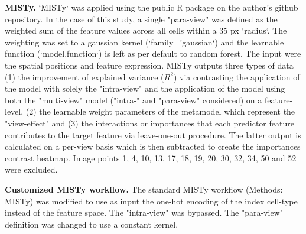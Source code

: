 \textbf{MISTy.} `MISTy` was applied using the public R package on the author's github repository. In the case of this study, a single "para-view" was defined as the weighted sum of the feature values across all cells within a 35 px `radius`. The weighting was set to a gaussian kernel (`family='gaussian`) and the learnable function (`model.function`) is left as per default to random forest. The input were the spatial positions and feature expression. MISTy outputs three types of data (1) the improvement of explained variance ($R^2$) via contrasting the application of the model with solely the "intra-view" and the application of the model using both the "multi-view" model ("intra-" and "para-view" considered) on a feature-level, (2) the learnable weight parameters of the metamodel which represent the "view-effect" and (3) the interactions or importances that each predictor feature contributes to the target feature via leave-one-out procedure. The latter output is calculated on a per-view basis which is then subtracted to create the importances contrast heatmap. Image points 1, 4, 10, 13, 17, 18, 19, 20, 30, 32, 34, 50 and 52 were excluded.

\textbf{Customized MISTy workflow.} The standard MISTy workflow (Methods: MISTy) was modified to use as input the one-hot encoding of the index cell-type instead of the feature space. The "intra-view" was bypassed. The "para-view" definition was changed to use a constant kernel.
